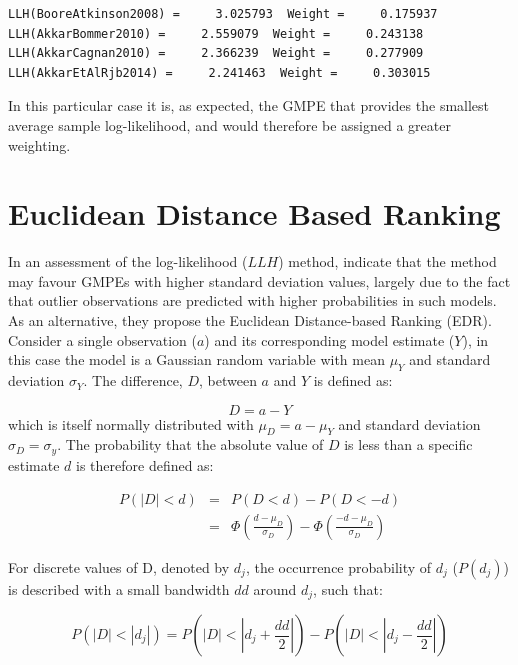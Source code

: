 \begin{verbatim}
LLH(BooreAtkinson2008) =     3.025793  Weight =     0.175937
LLH(AkkarBommer2010) =     2.559079  Weight =     0.243138
LLH(AkkarCagnan2010) =     2.366239  Weight =     0.277909
LLH(AkkarEtAlRjb2014) =     2.241463  Weight =     0.303015
\end{verbatim}

In this particular case it is, as expected, the \textcite{Akkar_etal2014} GMPE that provides the smallest average sample log-likelihood, and would therefore be assigned a greater weighting.

\section{Euclidean Distance Based Ranking \parencite{KaleAkkar2013}}
\label{sec:edr}

In an assessment of the log-likelihood ($LLH$) method, \textcite{KaleAkkar2013} indicate that the method may favour GMPEs with higher standard deviation values, largely due to the fact that outlier observations are predicted with higher probabilities in such models. As an alternative, they propose the Euclidean Distance-based Ranking (EDR). Consider a single observation ($a$) and its corresponding model estimate ($Y$), in this case the model is a Gaussian random variable with mean $\mu_Y$ and standard deviation $\sigma_Y$. The difference, $D$, between $a$ and $Y$ is defined as:

\begin{equation}
D = a - Y
\end{equation}
\noindent which is itself normally distributed with $\mu_D = a - \mu_Y$ and standard deviation $\sigma_D = \sigma_y$. The probability that the absolute value of $D$ is less than a specific estimate $d$ is therefore defined as:

\begin{eqnarray}
P \left( {|D| < d} \right) &=& P \left( {D < d} \right) - P \left( {D < -d} \right) \nonumber \\
 &=& \Phi \left( {\frac{d - \mu_D}{\sigma_D}} \right) - \Phi \left( {\frac{-d - \mu_D}{\sigma_D}} \right)
\end{eqnarray}

For discrete values of D, denoted by $d_j$, the occurrence probability of $d_j$ ($P \left( {d_j} \right)$) is described with a small bandwidth $dd$ around $d_j$, such that:

\begin{equation}
P \left( {|D| < |d_j|} \right) = P \left( {|D| < |d_j + \frac{dd}{2}|} \right) - P \left( {|D| < |d_j - \frac{dd}{2}|} \right)
\end{equation}

